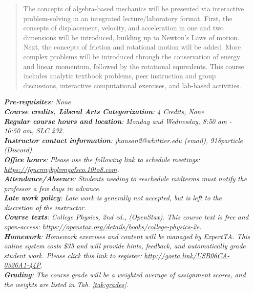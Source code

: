 \documentclass[10pt]{article}
\begin{document}
\maketitle

\begin{abstract}
The concepts of algebra-based mechanics will be presented via interactive problem-solving in an integrated lecture/laboratory format.  First, the concepts of displacement, velocity, and acceleration in one and two dimensions will be introduced, building up to Newton's Laws of motion.  Next, the concepts of friction and rotational motion will be added.  More complex problems will be introduced through the conservation of energy and linear momentum, followed by the rotational equivalents.  This course includes analytic textbook problems, peer instruction and group discussions, interactive computational exercises, and lab-based activities.
\end{abstract}
\noindent
\textit{\textbf{Pre-requisites}: None} \\
\textit{\textbf{Course credits, Liberal Arts Categorization}: 4 Credits, None} \\
\textit{\textbf{Regular course hours and location}: Monday and Wednesday, 8:50 am - 10:50 am, SLC 232.} \\
\textit{\textbf{Instructor contact information}: jhanson2@whittier.edu (email), 918particle (Discord).} \\
\textit{\textbf{Office hours}: Please use the following link to schedule meetings: \url{https://fgucmvjkylvmgqfsco.10to8.com}.} \\
\textit{\textbf{Attendance/Absence}: Students needing to reschedule midterms must notify the professor a few days in advance.} \\ 
\textit{\textbf{Late work policy}: Late work is generally not accepted, but is left to the discretion of the instructor.} \\
\textit{\textbf{Course texts}: College Physics, 2nd ed., (OpenStax).  This course text is free and open-access: \url{https://openstax.org/details/books/college-physics-2e}.} \\
\textit{\textbf{Homework}: Homework exercises and content will be managed by ExpertTA.  This online system costs \$35 and will provide hints, feedback, and automatically grade student work.  Please click this link to register: \url{http://goeta.link/USB06CA-0326A1-44P}.} \\
\textit{\textbf{Grading}: The course grade will be a weighted average of assignment scores, and the weights are listed in Tab. \ref{tab:grades}.}
\end{document}
